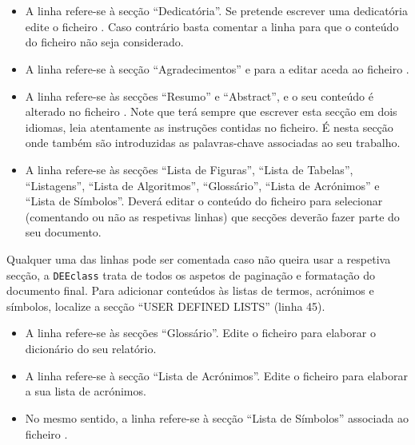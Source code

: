 \begin{itemize}
\item A linha \verb|| refere-se à secção ``Dedicatória''. Se pretende escrever uma dedicatória edite o ficheiro . Caso contrário basta comentar a linha para que o conteúdo do ficheiro não seja considerado.
\item A linha \verb|| refere-se à secção ``Agradecimentos'' e para a editar aceda ao ficheiro .
\item A linha \verb|| refere-se às secções ``Resumo'' e ``Abstract'', e o seu conteúdo é alterado no ficheiro . Note que terá sempre que escrever esta secção em dois idiomas, leia atentamente as instruções contidas no ficheiro. É nesta secção onde também são introduzidas as palavras-chave associadas ao seu trabalho.
\item A linha \verb|| refere-se às secções ``Lista de Figuras'', ``Lista de Tabelas'', ``Listagens'', ``Lista de Algoritmos'', ``Glossário'', ``Lista de Acrónimos'' e ``Lista de Símbolos''. Deverá editar o conteúdo do ficheiro  para selecionar (comentando ou não as respetivas linhas) que secções deverão fazer parte do seu documento.
\end{itemize}

Qualquer uma das linhas pode ser comentada caso não queira usar a respetiva secção, a \verb|DEEclass| trata de todos os aspetos de paginação e formatação do documento final. Para adicionar conteúdos às listas de termos, acrónimos e símbolos, localize a secção ``USER DEFINED LISTS'' (linha 45).

\begin{itemize}
\item A linha \verb|| refere-se às secções ``Glossário''. Edite o ficheiro  para elaborar o dicionário do seu relatório.
\item A linha \verb|| refere-se à secção ``Lista de Acrónimos''. Edite o ficheiro  para elaborar a sua lista de acrónimos.
\item No mesmo sentido, a linha \verb|| refere-se à secção ``Lista de Símbolos'' associada ao ficheiro .
\end{itemize}


